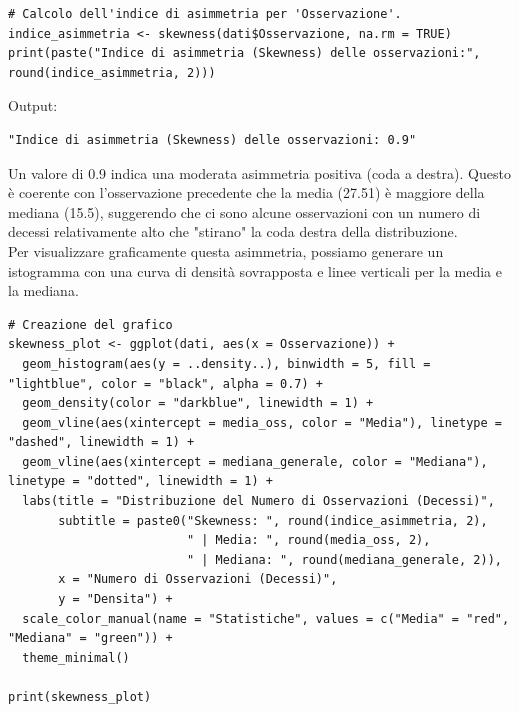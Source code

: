 \documentclass[14pt, openany, titlepage]{report} %
\begin{document}
\begin{center}
\begin{lstlisting}[breaklines=true]
# Calcolo dell'indice di asimmetria per 'Osservazione'.
indice_asimmetria <- skewness(dati$Osservazione, na.rm = TRUE)
print(paste("Indice di asimmetria (Skewness) delle osservazioni:", round(indice_asimmetria, 2)))
\end{lstlisting}
\end{center}
\noindent
Output:
\begin{verbatim}
"Indice di asimmetria (Skewness) delle osservazioni: 0.9"
\end{verbatim}
Un valore di 0.9 indica una moderata asimmetria positiva
 (coda a destra). Questo è coerente con l'osservazione precedente
  che la media (27.51) è maggiore della mediana (15.5), suggerendo 
  che ci sono alcune osservazioni con un numero di decessi relativamente
   alto che "stirano" la coda destra della distribuzione.\\

\noindent
Per visualizzare graficamente questa asimmetria, 
possiamo generare un istogramma con una curva di densità 
sovrapposta e linee verticali per la media e la mediana.

\begin{center}
\begin{lstlisting}[breaklines=true]
# Creazione del grafico
skewness_plot <- ggplot(dati, aes(x = Osservazione)) +
  geom_histogram(aes(y = ..density..), binwidth = 5, fill = "lightblue", color = "black", alpha = 0.7) +
  geom_density(color = "darkblue", linewidth = 1) +
  geom_vline(aes(xintercept = media_oss, color = "Media"), linetype = "dashed", linewidth = 1) +
  geom_vline(aes(xintercept = mediana_generale, color = "Mediana"), linetype = "dotted", linewidth = 1) +
  labs(title = "Distribuzione del Numero di Osservazioni (Decessi)",
       subtitle = paste0("Skewness: ", round(indice_asimmetria, 2), 
                         " | Media: ", round(media_oss, 2), 
                         " | Mediana: ", round(mediana_generale, 2)),
       x = "Numero di Osservazioni (Decessi)",
       y = "Densita") +
  scale_color_manual(name = "Statistiche", values = c("Media" = "red", "Mediana" = "green")) +
  theme_minimal()

print(skewness_plot)
\end{lstlisting}
\end{center}
\end{document}
